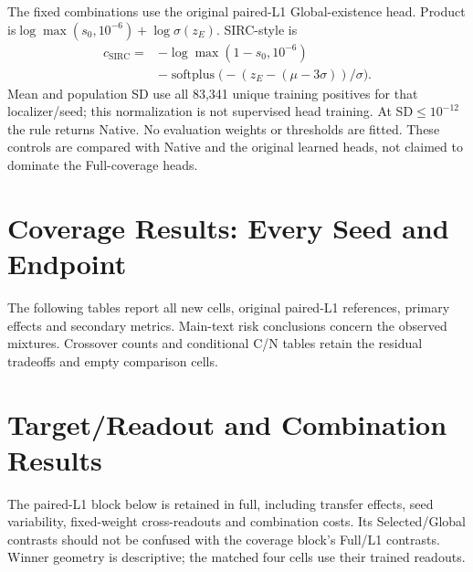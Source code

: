 \documentclass[10pt,twocolumn,letterpaper]{article}
\begin{document}
The fixed combinations use the original paired-L1 Global-existence head.
Product is$\log\max(s_0,10^{-6})+\log\sigma(z_E)$.
SIRC-style \cite{xia2024sirc} is
\begin{align}
c_{\mathrm{SIRC}}={}&-\log\max(1-s_0,10^{-6})\nonumber\\
&-\operatorname{softplus}\big(-(z_E-(\mu-3\sigma))/\sigma\big).
\end{align}
Mean and population SD use all 83,341 unique training positives for that
localizer/seed; this normalization is not supervised head training.
At SD$\leq10^{-12}$ the rule returns Native. No evaluation weights or
thresholds are fitted. These controls are compared with Native and the
original learned heads, not claimed to dominate the Full-coverage heads.

\section{Coverage Results: Every Seed and Endpoint}
The following tables report all new cells, original paired-L1 references,
primary effects and secondary metrics. Main-text risk conclusions concern
the observed mixtures. Crossover counts and conditional C/N tables retain
the residual tradeoffs and empty comparison cells.











\FloatBarrier

\section{Target/Readout and Combination Results}
The paired-L1 block below is retained in full, including transfer effects,
seed variability, fixed-weight cross-readouts and combination costs. Its
Selected/Global contrasts should not be confused with the coverage block's
Full/L1 contrasts. Winner geometry is descriptive; the matched four cells
use their trained readouts.











\FloatBarrier
\end{document}
